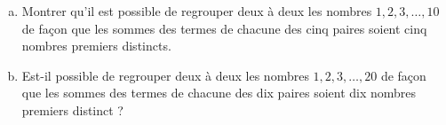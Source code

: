 \documentclass[varwidth]{standalone}
\begin{document}
    \begin{enumerate}[a)]
        \item Montrer qu'il est possible de regrouper deux \`a deux les nombres $1, 2, 3, \dots, 10$ de fa\c con que les sommes des termes de chacune des cinq paires soient cinq nombres premiers distincts.
        \item Est-il possible de regrouper deux \`a deux les nombres $1, 2, 3, \dots, 20$ de fa\c con que les sommes des termes de chacune des dix paires soient dix nombres premiers distinct ?
    \end{enumerate}
\end{document}
